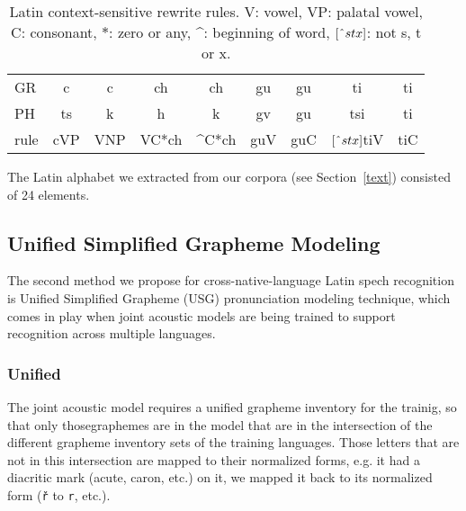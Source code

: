 \documentclass[runningheads,a4paper]{llncs}
\begin{document}
\begin{table}\label{tbl:context}
	\centering
	\caption{Latin context-sensitive rewrite rules. V: vowel, VP: palatal vowel, C: consonant, $*$: zero or any, \string^: beginning of word, $[\string^stx]$: not s, t or x.}
	\begin{tabular}{l|cc|cc|cc|cc}
	\hline
	GR & c & c & ch & ch & gu & gu & ti & ti \\
	PH & ts & k & h & k & gv & gu & tsi & ti \\
	\hline
	rule & \multicolumn{1}{c|}{cVP} & \multicolumn{1}{c|}{VNP} & \multicolumn{1}{c|}{VC*ch} & \multicolumn{1}{c|}{\string^C*ch} & \multicolumn{1}{c|}{guV} & \multicolumn{1}{c|}{guC} & \multicolumn{1}{c|}{$[\string^stx]$tiV} & \multicolumn{1}{c|}{tiC} \\
	\hline
	\end{tabular}
\end{table}

The Latin alphabet we extracted from our corpora (see Section~\ref{text}) consisted of 24 elements.
\subsection{Unified Simplified Grapheme Modeling}\label{usg}
The second method we propose for cross-native-language Latin spech recognition is Unified Simplified Grapheme (USG) pronunciation modeling technique, which comes in play when joint acoustic models are being trained to support recognition across multiple languages.
\subsubsection{Unified}
The joint acoustic model requires a unified grapheme inventory for the trainig, so that only thosegraphemes are in the model that are in the intersection of the different grapheme inventory sets of the training languages.
Those letters that are not in this intersection are mapped to their normalized forms, e.g. it had a diacritic mark (acute, caron, etc.) on it, we mapped it back to its normalized form (\texttt{\v{r}} to \texttt{r}, etc.).
\end{document}
